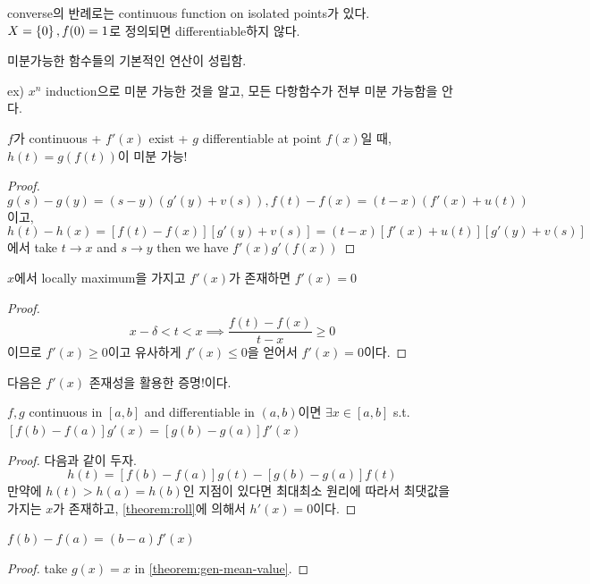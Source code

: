 \documentclass{article}
\begin{document}
converse의 반례로는 continuous function on isolated points가 있다. $X=\left\{ 0 \right\}, f(0)=1$로 정의되면 differentiable하지 않다.

\begin{theorem}
    미분가능한 함수들의 기본적인 연산이 성립함.
\end{theorem}

ex) $x^n$ induction으로 미분 가능한 것을 알고, 모든 다항함수가 전부 미분 가능함을 안다.

\begin{theorem}
    $f$가 continuous + $f'(x)$ exist + $g$ differentiable at point $f(x)$일 때, $h(t)=g(f(t))$이 미분 가능!
\end{theorem}

\begin{proof}
\[
    g(s)-g(y)=(s-y)(g'(y)+v(s)), f(t)-f(x)=(t-x)(f'(x)+u(t))
\]
이고, 
\[
    h(t)-h(x)=[f(t)-f(x)][g'(y)+v(s)]=(t-x)[f'(x)+u(t)][g'(y)+v(s)]
\]
에서 take $t \to x$ and $s \to y$ then we have $f'(x)g'(f(x))$
\end{proof}

\begin{theorem}
    $x$에서 locally maximum을 가지고 $f'(x)$가 존재하면 $f'(x)=0$
    \label{theorem:roll}
\end{theorem}
\begin{proof}
    \[x-\delta < t < x \implies \frac{f(t)-f(x)}{t-x} \geq 0\]
    이므로 $f'(x)\geq0$이고 유사하게 $f'(x)\leq 0$을 얻어서 $f'(x)=0$이다.
\end{proof}

다음은 $f'(x)$ 존재성을 활용한 증명!이다.

\begin{theorem}
    $f,g$ continuous in $[a,b]$ and differentiable in $(a,b)$이면 $\exists x \in [a,b]$ s.t. $[f(b)-f(a)]g'(x)=[g(b)-g(a)]f'(x)$
    \label{theorem:gen-mean-value}
\end{theorem}
\begin{proof}
    다음과 같이 두자. \[h(t)=[f(b)-f(a)]g(t)-[g(b)-g(a)]f(t)\]
    만약에 $h(t)>h(a)=h(b)$인 지점이 있다면 최대최소 원리에 따라서 최댓값을 가지는 $x$가 존재하고, \cref{theorem:roll}에 의해서 $h'(x)=0$이다.    
\end{proof}

\begin{theorem}
    $f(b)-f(a)=(b-a)f'(x)$
    \label{theorem:mean-value}
\end{theorem}
\begin{proof}
    take $g(x)=x$ in \cref{theorem:gen-mean-value}.
\end{proof}
    
\end{document}
